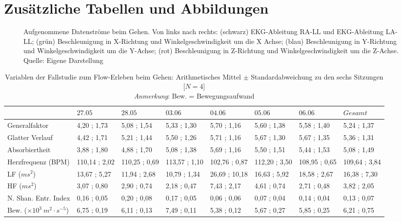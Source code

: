 \pagebreak

\section{Zusätzliche Tabellen und Abbildungen}

\begin{sidewaysfigure}
	\resizebox{1.00\textwidth}{!}{%
	    
	}%
	\caption[Aufgenommene Datenströme beim Gehen]{Aufgenommene Datenströme beim Gehen. Von links nach rechts: (schwarz) EKG-Ableitung RA-LL und EKG-Ableitung LA-LL; (grün) Beschleunigung in X-Richtung und Winkelgeschwindigkeit um die X Achse; (blau) Beschleunigung in Y-Richtung und Winkelgeschwindigkeit um die Y-Achse; (rot) Beschleunigung in Z-Richtung und Winkelgeschwindigkeit um die Z-Achse. Quelle: Eigene Darstellung}
	\label{fig:B_1_daten}
\end{sidewaysfigure}

\begin{sidewaystable}
\centering
	\caption[Variablen zu den sechs Sitzungen (Fallstudie: Gehen)]{Variablen der Fallstudie zum Flow-Erleben beim Gehen: Arithmetisches Mittel $\pm$ Standardabweichung zu den sechs Sitzungen [$N = 4$] \\ \hspace{\textwidth}\emph{Anmerkung}: Bew. = Bewegungsaufwand}
	\label{tab:variablen_nach_sitzung_fallstudie_gehen}
	\begin{tabular}{lyyyyyyy}
\toprule
 & $27.05$ & $28.05$ & $03.06$ & $04.06$ & $05.06$ & $06.06$ & $Gesamt$ \\ 
  \midrule
Generalfaktor & 4{,}20 ; 1{,}73 & 5{,}08 ; 1{,}54 & 5{,}33 ; 1{,}30 & 5{,}70 ; 1{,}16 & 5{,}60 ; 1{,}38 & 5{,}58 ; 1{,}40 & 5{,}24 ; 1{,}37 \\ 
  Glatter Verlauf & 4{,}42 ; 1{,}71 & 5{,}21 ; 1{,}44 & 5{,}50 ; 1{,}26 & 5{,}71 ; 1{,}16 & 5{,}67 ; 1{,}30 & 5{,}67 ; 1{,}35 & 5{,}36 ; 1{,}31 \\ 
  Absorbiertheit & 3{,}88 ; 1{,}80 & 4{,}88 ; 1{,}70 & 5{,}08 ; 1{,}38 & 5{,}69 ; 1{,}16 & 5{,}50 ; 1{,}51 & 5{,}44 ; 1{,}53 & 5{,}08 ; 1{,}49 \\ 
  Herzfrequenz (BPM) & 110{,}14 ; 2{,}02 & 110{,}25 ; 0{,}69 & 113{,}57 ; 1{,}10 & 102{,}76 ; 0{,}87 & 112{,}20 ; 3{,}50 & 108{,}95 ; 0{,}65 & 109{,}64 ; 3{,}84 \\ 
  LF ($ms^2$) & 13{,}67 ; 5{,}27 & 11{,}94 ; 2{,}68 & 10{,}79 ; 1{,}34 & 26{,}69 ; 10{,}18 & 16{,}63 ; 5{,}92 & 18{,}58 ; 2{,}67 & 16{,}38 ; 7{,}30 \\ 
  HF ($ms^2$) & 3{,}07 ; 0{,}80 & 2{,}90 ; 0{,}74 & 2{,}18 ; 0{,}47 & 7{,}43 ; 2{,}17 & 4{,}61 ; 0{,}74 & 2{,}71 ; 0{,}48 & 3{,}82 ; 2{,}05 \\ 
  N. Shan. Entr. Index & 0{,}16 ; 0{,}05 & 0{,}20 ; 0{,}08 & 0{,}17 ; 0{,}05 & 0{,}06 ; 0{,}06 & 0{,}07 ; 0{,}04 & 0{,}14 ; 0{,}04 & 0{,}13 ; 0{,}07 \\ 
  Bew. ($\times 10^3 \: m^2 \cdot s^{-5}$) & 6{,}75 ; 0{,}19 & 6{,}11 ; 0{,}13 & 7{,}49 ; 0{,}11 & 5{,}38 ; 0{,}12 & 5{,}67 ; 0{,}27 & 5{,}85 ; 0{,}25 & 6{,}21 ; 0{,}75 \\ 
\bottomrule
\end{tabular}
\end{sidewaystable}

